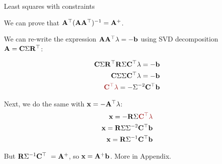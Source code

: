 \documentclass{beamer}
\begin{document}
\begin{frame}{Least squares with constraints}
	\begin{flushleft}
		
		We can prove that $ \mathbf{A}^\top  (\mathbf{A} \mathbf{A}^\top )^{-1} = \mathbf{A}^+$.
		
		\bigskip
		
		We can re-write the expression $\mathbf{A} \mathbf{A}^\top  \lambda= -\mathbf{b}$ using SVD decomposition $\mathbf{A} = \mathbf{C}\Sigma\mathbf{R}^\top$:
		
		\begin{align}
			 \bo{C}\Sigma\bo{R}\T \bo{R}\Sigma\bo{C}\T  \lambda= -\bo{b}
			 \\
			 \bo{C}\Sigma \Sigma\bo{C}\T  \lambda= -\bo{b}
			 \\
			  \textcolor{mydarkred}{\bo{C}\T  \lambda}= -\Sigma^{-2} \bo{C}\T \bo{b}
		\end{align}				
		
		Next, we do the same with $\mathbf{x} = -\mathbf{A}^\top  \lambda$:
		\begin{align}
			\bo{x} = -\bo{R}\Sigma\textcolor{mydarkred}{\bo{C}\T  \lambda}
			\\
			\bo{x} = \bo{R}\Sigma\Sigma^{-2} \bo{C}\T \bo{b}
			\\
			\bo{x} = \bo{R}\Sigma^{-1} \bo{C}\T \bo{b}
		\end{align}				
		
		But $ \mathbf{R}\Sigma^{-1} \mathbf{C}^\top \ = \mathbf{A}^+$, so $\mathbf{x} =\mathbf{A}^+ \mathbf{b}$. More in Appendix.
		
	\end{flushleft}
\end{frame}
\end{document}
